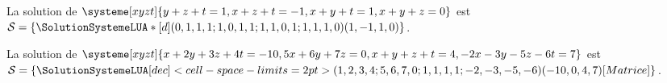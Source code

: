 \documentclass[french,a4paper,10pt]{article}
\begin{document}
\begin{demohigh}
La solution de $\systeme[xyzt]{y+z+t=1,x+z+t=-1,x+y+t=1,x+y+z=0}$ est $\mathcal{S}=%
\left\lbrace\SolutionSystemeLUA*[d](0,1,1,1;1,0,1,1;1,1,0,1;1,1,1,0)(1,-1,1,0)\right\rbrace$.
\end{demohigh}

\begin{demohigh}
La solution de $\systeme[xyzt]{x+2y+3z+4t=-10,5x+6y+7z=0,x+y+z+t=4,-2x-3y-5z-6t=7}$ est $\mathcal{S}=
\left\lbrace
\SolutionSystemeLUA
    [dec]<cell-space-limits=2pt>
    (1,2,3,4;5,6,7,0;1,1,1,1;-2,-3,-5,-6)(-10,0,4,7)
    [Matrice]
\right\rbrace$.
\end{demohigh}
\end{document}
